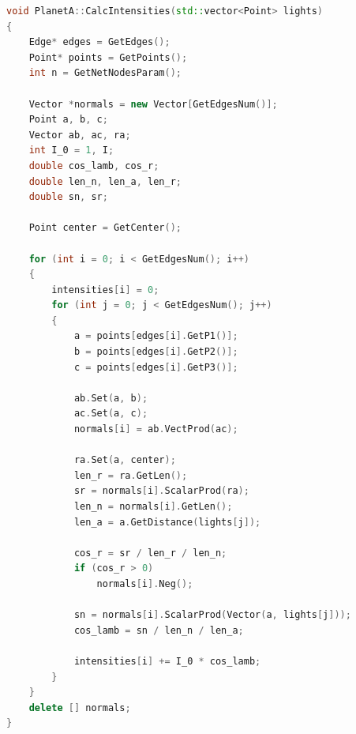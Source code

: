     \par \text{  }
    \begin{lstlisting}[language=C++, label=lst:P_z, caption=Алгоритм простой закраски]
void PlanetA::CalcIntensities(std::vector<Point> lights)
{
    Edge* edges = GetEdges();
    Point* points = GetPoints();
    int n = GetNetNodesParam();

    Vector *normals = new Vector[GetEdgesNum()];
    Point a, b, c;
    Vector ab, ac, ra;
    int I_0 = 1, I;
    double cos_lamb, cos_r;
    double len_n, len_a, len_r;
    double sn, sr;

    Point center = GetCenter();

    for (int i = 0; i < GetEdgesNum(); i++)
    {
        intensities[i] = 0;
        for (int j = 0; j < GetEdgesNum(); j++)
        {
            a = points[edges[i].GetP1()];
            b = points[edges[i].GetP2()];
            c = points[edges[i].GetP3()];

            ab.Set(a, b);
            ac.Set(a, c);
            normals[i] = ab.VectProd(ac);

            ra.Set(a, center);
            len_r = ra.GetLen();
            sr = normals[i].ScalarProd(ra);
            len_n = normals[i].GetLen();
            len_a = a.GetDistance(lights[j]);

            cos_r = sr / len_r / len_n;
            if (cos_r > 0)
                normals[i].Neg();

            sn = normals[i].ScalarProd(Vector(a, lights[j]));
            cos_lamb = sn / len_n / len_a;

            intensities[i] += I_0 * cos_lamb;
        }
    }
    delete [] normals;
}
        \end{lstlisting}

